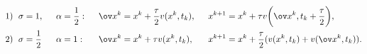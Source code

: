 \begin{alignat*}{4} 


1)\ \; \sigma&=1, &\ \; \alpha&=\frac{1}{2}: &\ \; 


\ov x^k&=x^k+\frac{\tau}{2}v(x^k,t_k), &\ \; x^{k+1}&=x^k+\tau v 


\bigg(\ov x^k,t_k+\frac{\tau}{2} \bigg), \\ 


% 


2)\ \; \sigma&=\frac{1}{2} &\ \; \alpha&=1: &\ \; \ov x^k&= 


x^k+\tau v(x^k,t_k), &\ \; x^{k+1}&= x^k+\frac{\tau}{2} 


(v(x^k,t_k)+v(\ov x^k,t_k)). 


\end{alignat*} 


 


 


